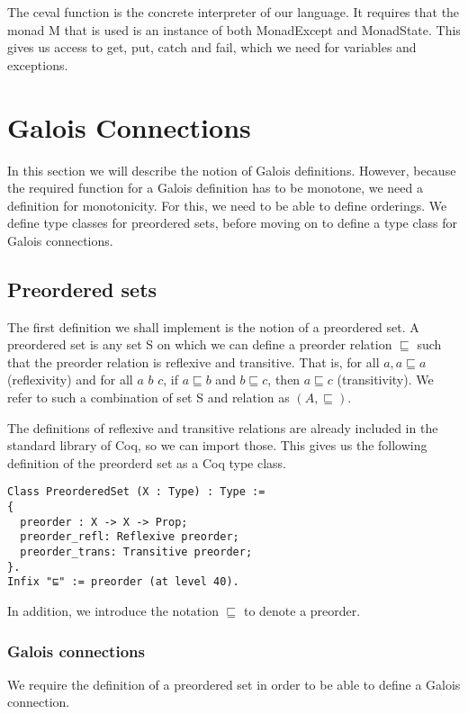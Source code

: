 The ceval function is the concrete interpreter of our language. It requires
that the monad M that is used is an instance of both MonadExcept and
MonadState. This gives us access to get, put, catch and fail, which we need for
variables and exceptions.

\section{Galois Connections}
In this section we will describe the notion of Galois definitions. However,
because the required function for a Galois definition has to be monotone, we
need a definition for monotonicity. For this, we need to be able to define
orderings. We define type classes for
preordered sets, before moving on to define a type class for Galois
connections.

\subsection{Preordered sets}
The first definition we shall implement is the notion of a preordered set. 
A preordered set is any set S on which we can define a preorder relation
$\sqsubseteq$ such that the preorder relation is reflexive and transitive. That
is, for all $a, a \sqsubseteq a$ (reflexivity) and for all $a$ $b$ $c$, if $a
\sqsubseteq b$ and $b \sqsubseteq c$, then $a \sqsubseteq c$ (transitivity).
We refer to such a combination of set S and relation as $(A, \sqsubseteq)$.

The definitions of reflexive and transitive relations are already included in
the standard library of Coq, so we can import those. This gives us the
following definition of the preorderd set as a Coq type class.

\begin{listing}
\begin{verbatim}
Class PreorderedSet (X : Type) : Type :=
{
  preorder : X -> X -> Prop;
  preorder_refl: Reflexive preorder;
  preorder_trans: Transitive preorder;
}.
Infix "⊑" := preorder (at level 40).
\end{verbatim}
\end{listing}

In addition, we introduce the notation $⊑$ to denote a preorder.

\subsubsection{Galois connections}
We require the definition of a preordered set in order to be able to define a
Galois connection.

